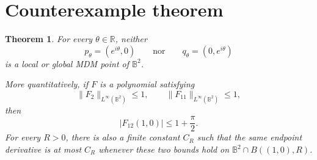 \documentclass[11pt]{article}
\newtheorem{theorem}{Theorem}
\newcommand{\B}{\mathbb B}
\begin{document}
\section*{Counterexample theorem}

\begin{theorem}\label{thm:main}
For every \(\theta\in\mathbb R\), neither
\[
 p_\theta=(e^{i\theta},0)
 \qquad\text{nor}\qquad
 q_\theta=(0,e^{i\theta})
\]
is a local or global MDM point of \(\B^2\).

More quantitatively, if \(F\) is a polynomial satisfying
\[
 \|F_2\|_{L^\infty(\B^2)}\le1,
 \qquad
 \|F_{11}\|_{L^\infty(\B^2)}\le1,
\]
then
\[
 |F_{12}(1,0)|\le 1+\frac\pi2.
\]
For every \(R>0\), there is also a finite constant \(C_R\) such that the same
endpoint derivative is at most \(C_R\) whenever these two bounds hold on
\(\B^2\cap B((1,0),R)\).
\end{theorem}
\end{document}
